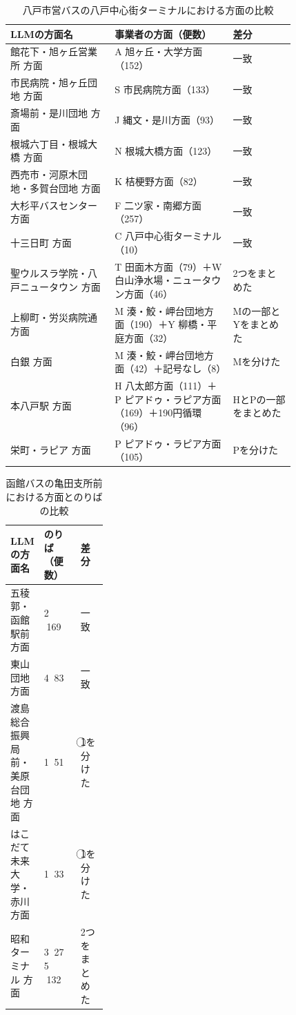 \begin{table}[tb]
    \centering
    \caption{八戸市営バスの八戸中心街ターミナルにおける方面の比較}
    \label{tab:direction-hachinohe}
    \scriptsize
    \begin{tabular}{p{0.3\linewidth}p{0.34\linewidth}p{0.18\linewidth}}
        \toprule
        LLMの方面名 & 事業者の方面（便数） & 差分 \\
        \midrule
        館花下・旭ヶ丘営業所 方面 & A 旭ヶ丘・大学方面（152） & 一致 \\
        市民病院・旭ヶ丘団地 方面 & S 市民病院方面（133） & 一致 \\
        斎場前・是川団地 方面 & J 縄文・是川方面（93） & 一致 \\
        根城六丁目・根城大橋 方面 & N 根城大橋方面（123） & 一致 \\
        西売市・河原木団地・多賀台団地 方面 & K 桔梗野方面（82） & 一致 \\
        大杉平バスセンター 方面 & F 二ツ家・南郷方面（257） & 一致 \\
        十三日町 方面 & C 八戸中心街ターミナル（10） & 一致 \\
        聖ウルスラ学院・八戸ニュータウン 方面 & T 田面木方面（79）＋W 白山浄水場・ニュータウン方面（46） & 2つをまとめた \\
        上柳町・労災病院通 方面 & M 湊・鮫・岬台団地方面（190）＋Y 柳橋・平庭方面（32） & Mの一部とYをまとめた \\
        白銀 方面 & M 湊・鮫・岬台団地方面（42）＋記号なし（8） & Mを分けた \\
        本八戸駅 方面 & H 八太郎方面（111）＋P ピアドゥ・ラピア方面（169）＋190円循環（96） & HとPの一部をまとめた \\
        栄町・ラピア 方面 & P ピアドゥ・ラピア方面（105） & Pを分けた \\
        \bottomrule
    \end{tabular}
\end{table}

\begin{table}[tb]
    \centering
    \caption{函館バスの亀田支所前における方面とのりばの比較}
    \label{tab:direction-kamedashisho}
    \scriptsize
    \begin{tabular}{p{0.28\linewidth}ll}
        \toprule
        LLMの方面名 & のりば（便数） & 差分 \\
        \midrule
        五稜郭・函館駅前 方面 & \textcircled{2}（169） & 一致 \\
        東山団地 方面 & \textcircled{4}（83） & 一致 \\
        渡島総合振興局前・美原台団地 方面 & \textcircled{1}（51） & \textcircled{1}を分けた \\
        はこだて未来大学・赤川 方面 & \textcircled{1}（33） & \textcircled{1}を分けた \\
        昭和ターミナル 方面 & \textcircled{3}（27）＋\textcircled{5}（132） & 2つをまとめた \\
        \bottomrule
    \end{tabular}
\end{table}
